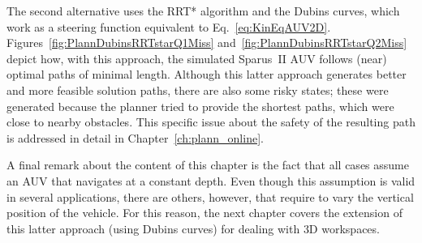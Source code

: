 The second alternative uses the \ac{RRT*} algorithm and the Dubins curves, which
work as a steering function equivalent to Eq.~\eqref{eq:KinEqAUV2D}.
Figures~\ref{fig:PlannDubinsRRTstarQ1Miss}
and~\ref{fig:PlannDubinsRRTstarQ2Miss} depict how, with this approach, the
simulated Sparus~II \ac{AUV} follows (near) optimal paths of minimal length.
Although this latter approach generates better and more feasible solution paths,
there are also some risky states; these were generated because the planner tried to
provide the shortest paths, which were close to nearby obstacles. This
specific issue about the safety of the resulting path is addressed in detail in
Chapter~\ref{ch:plann_online}.


A final remark about the content of this chapter is the fact that all cases
assume an \ac{AUV} that navigates at a constant depth. Even though this
assumption is valid in several applications, there are others, however, that
require to vary the vertical position of the vehicle. For this reason, the next
chapter covers the extension of this latter approach (using Dubins curves) for
dealing with \ac{3D} workspaces.



